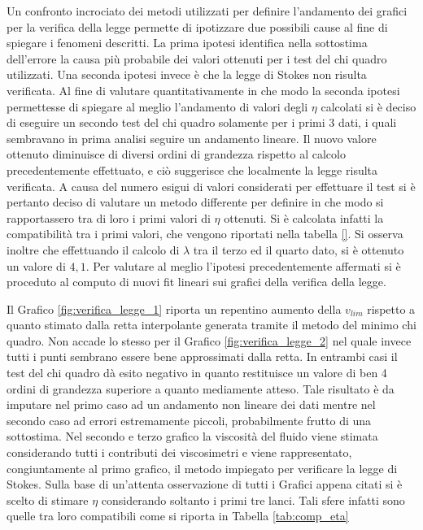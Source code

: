 \documentclass[a4paper,11pt,oneside]{article}
\begin{document}
Un confronto incrociato dei metodi utilizzati per definire l'andamento dei grafici per la verifica della legge permette di ipotizzare due possibili cause al fine di spiegare i fenomeni descritti. 
La prima ipotesi identifica nella sottostima dell'errore la causa più probabile dei valori ottenuti per i test del chi quadro utilizzati. Una seconda ipotesi invece è che la legge di Stokes non risulta verificata. Al fine di valutare quantitativamente in che modo la seconda ipotesi permettesse di spiegare al meglio l'andamento di valori degli $\eta$ calcolati si è deciso di eseguire un secondo test del chi quadro solamente per i primi 3 dati, i quali sembravano in prima analisi seguire un andamento lineare. Il nuovo valore ottenuto diminuisce di diversi ordini di grandezza rispetto al calcolo precedentemente effettuato, e ciò suggerisce che localmente la legge risulta verificata. A causa del numero esigui di valori considerati per effettuare il test si è pertanto deciso di valutare un metodo differente per definire in che modo si rapportassero tra di loro i primi valori di $\eta$ ottenuti. Si è calcolata infatti la compatibilità tra i primi valori, che vengono riportati nella tabella \ref{}. Si osserva inoltre che effettuando il calcolo di $\lambda$ tra il terzo ed il quarto dato, si è ottenuto un valore di $4,1$. Per valutare al meglio l'ipotesi precedentemente affermati si è proceduto al computo di nuovi fit lineari sui grafici della verifica della legge.




Il Grafico \ref{fig:verifica_legge_1} riporta un repentino aumento della $v_{lim}$ rispetto a quanto stimato dalla retta interpolante generata tramite il metodo del minimo chi quadro. Non accade lo stesso per il Grafico \ref{fig:verifica_legge_2} nel quale invece tutti i punti sembrano essere bene approssimati dalla retta. In entrambi casi il test del chi quadro dà esito negativo in quanto restituisce un valore di ben 4 ordini di grandezza superiore a quanto mediamente atteso. Tale risultato è da imputare nel primo caso ad un andamento non lineare dei dati mentre nel secondo caso ad errori estremamente piccoli, probabilmente frutto di una sottostima.\newline
Nel secondo e terzo grafico la viscosità del fluido viene stimata considerando tutti i contributi dei viscosimetri e viene rappresentato, congiuntamente al primo grafico, il metodo impiegato per verificare la legge di Stokes.
Sulla base di un'attenta osservazione di tutti i Grafici appena citati si è scelto di stimare $\eta$ considerando soltanto i primi tre lanci. Tali sfere infatti sono quelle tra loro compatibili come si riporta in Tabella \ref{tab:comp_eta}
\end{document}
